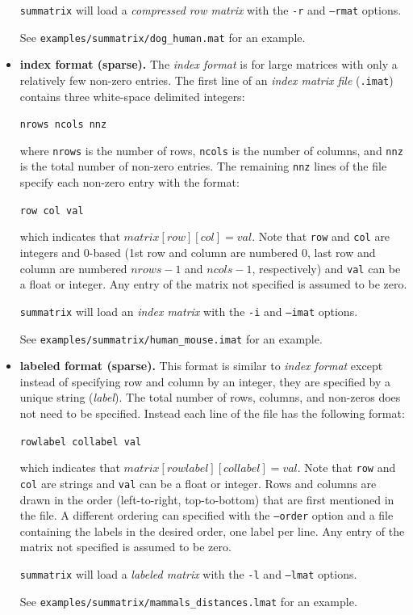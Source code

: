 \documentclass[12pt]{article}
\newcommand{\code}[1]{{\tt #1}}
\newcommand{\codeblock}[1]{\vspace{.1in} {\tt #1} \vspace{.1in}}
\begin{document}
\begin{itemize}
    \code{summatrix} will load a {\em compressed row matrix} with the \code{-r}
    and  \code{--rmat} options.
    
    See \code{examples/summatrix/dog\_human.mat} for an example.


    \item {\bf index format (sparse).}
    The {\em index format} is for large matrices with only a
    relatively few non-zero entries.     
    The first line of an {\em index matrix file} (\code{*.imat}) contains three
    white-space delimited integers:
    
    \codeblock{nrows ncols nnz}
    
    where \code{nrows} is the number of rows, \code{ncols} is the number of
    columns, and \code{nnz} is the total number of non-zero entries.  The
    remaining \code{nnz} lines of  the file specify each non-zero entry with the
    format:

    \codeblock{row col val}

    which indicates that $matrix[row][col] = val$.  Note that 
    \code{row} and \code{col} are integers and 0-based (1st row and column are
    numbered 0, last row and column are numbered $nrows-1$ and $ncols-1$,
    respectively) and \code{val} can be a float or integer.  Any entry of the
    matrix not specified is assumed to be zero.

    \code{summatrix} will load an {\em index matrix} with the \code{-i} and 
    \code{--imat} options.
    
    See \code{examples/summatrix/human\_mouse.imat} for an example.


    \item {\bf labeled format (sparse).}       
    This format is similar to {\em index format} except instead of specifying
    row and column by an integer, they are specified by a unique string 
    ({\em label}).
    The total number of rows, columns, and non-zeros does not need to be
    specified. Instead each line of the file has the following format:

    \codeblock{rowlabel collabel val}

    which indicates that $matrix[rowlabel][collabel] = val$.  Note that 
    \code{row} and \code{col} are strings and \code{val} can be a float or 
    integer.  Rows and columns are drawn in the order (left-to-right,
    top-to-bottom) that are first mentioned in the file.  
    A different ordering can specified with the \code{--order} option and a file
    containing the labels in the desired order, one label per line.
    Any entry of the matrix not specified is assumed to be zero.
    
    \code{summatrix} will load a {\em labeled matrix} with the \code{-l} and 
    \code{--lmat} options.
    
    See \code{examples/summatrix/mammals\_distances.lmat} for an example.

\end{itemize}
\end{document}
